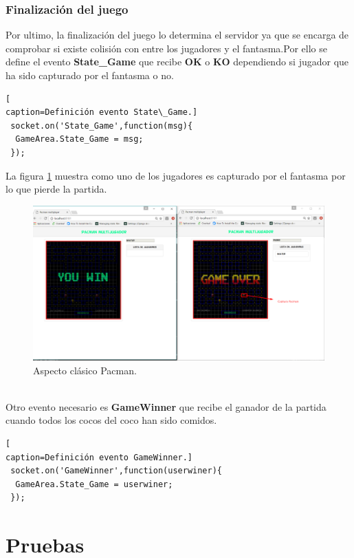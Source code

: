 \subsubsection*{Finalización del juego}
Por ultimo, la finalización del juego lo determina el servidor ya que se encarga de comprobar si existe colisión con entre los jugadores y el fantasma.Por ello se define el evento \textbf{State\_Game} que recibe \textbf{OK} o \textbf{KO} dependiendo si jugador que ha sido capturado por el fantasma o no.
\begin{lstlisting}[
caption=Definición evento State\_Game.]
 socket.on('State_Game',function(msg){
  GameArea.State_Game = msg;
 });
\end{lstlisting}
La figura \ref{fig:Captura_Pacman} muestra como uno de los jugadores es capturado por el fantasma por lo que pierde la partida.
\begin{figure}[!h]
\begin{center}
   \includegraphics[width=0.6\linewidth]{Figures/Captura_Pacman}
	\decoRule
	\caption[Aspecto clásico Pacman]{Aspecto clásico Pacman.}
\label{fig:Captura_Pacman}
\end{center}
\end{figure}
\\Otro evento necesario es \textbf{GameWinner} que recibe el ganador de la partida cuando todos los cocos del coco han sido comidos.
\begin{lstlisting}[
caption=Definición evento GameWinner.]
 socket.on('GameWinner',function(userwiner){
  GameArea.State_Game = userwiner;
 });
\end{lstlisting}
\section{Pruebas}
